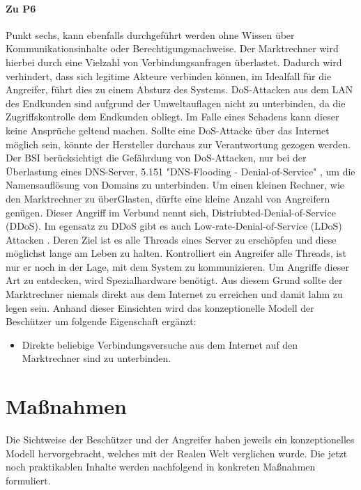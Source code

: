 \documentclass[11pt,a4paper]{report}
\begin{document}
\paragraph{Zu P6} Punkt sechs, kann ebenfalls durchgeführt werden ohne Wissen über Kommunikationsinhalte oder Berechtigungsnachweise. Der Marktrechner wird hierbei durch eine Vielzahl von Verbindungsanfragen überlastet. Dadurch wird verhindert, dass sich legitime Akteure verbinden können, im Idealfall für die Angreifer, führt dies zu einem Absturz des Systems. DoS-Attacken aus dem LAN des Endkunden sind aufgrund der Umweltauflagen nicht zu unterbinden, da die Zugriffskontrolle dem Endkunden obliegt. Im Falle eines Schadens kann dieser keine Ansprüche geltend machen. Sollte eine DoS-Attacke über das Internet möglich sein, könnte der Hersteller durchaus zur Verantwortung gezogen werden. Der BSI berücksichtigt die Gefährdung von DoS-Attacken, nur bei der Überlastung eines DNS-Server, 5.151 "DNS-Flooding - Denial-of-Service" \cite{bsi_g5151}, um die Namensauflösung von Domains zu unterbinden. Um einen kleinen Rechner, wie den Marktrechner zu überGlasten, dürfte eine kleine Anzahl von Angreifern genügen. Dieser Angriff im Verbund nennt sich, Distriubted-Denial-of-Service (DDoS). Im egensatz zu DDoS gibt es auch Low-rate-Denial-of-Service (LDoS) Attacken \cite[s.~303]{gutmann}. Deren Ziel ist es alle Threads eines Server zu erschöpfen und diese möglichst lange am Leben zu halten. Kontrolliert ein Angreifer alle Threads, ist nur er noch in der Lage, mit dem System zu kommunizieren. Um Angriffe dieser Art zu entdecken, wird Spezialhardware benötigt. Aus diesem Grund sollte der Marktrechner niemals direkt aus dem Internet zu erreichen und damit lahm zu legen sein. Anhand dieser Einsichten wird das konzeptionelle Modell der Beschützer um folgende Eigenschaft ergänzt:

\begin{itemize}[leftmargin=*]
\item Direkte beliebige Verbindungsversuche aus dem Internet auf den Marktrechner sind zu unterbinden.
\end{itemize}

\section{Maßnahmen} \label{sec:analysis_measures}

Die Sichtweise der Beschützer und der Angreifer haben jeweils ein konzeptionelles Modell hervorgebracht, welches mit der Realen Welt verglichen wurde. Die jetzt noch praktikablen Inhalte werden nachfolgend in konkreten Maßnahmen formuliert.
\end{document}
